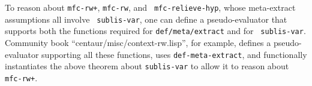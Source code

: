 To reason about {\tt mfc-rw+}, {\tt mfc-rw}, and {\tt
  mfc-relieve-hyp}, whose meta-extract assumptions all involve {\tt
  sublis-var}, one can define a pseudo-evaluator that supports both
the functions required for \texttt{def\-/meta\-/extract} and for {\tt
  sublis-var}.  Community book ``centaur/misc/context-rw.lisp'', for
example, defines a pseudo-evaluator supporting all these functions,
uses {\tt def-meta-extract}, and functionally instantiates the above
theorem about {\tt sublis-var} to allow it to reason about {\tt
  mfc-rw+}.


\begin{comment}
Sol, the list above seems to be more or less just
  saying that the theorems provided by def-meta-extract are those
  described in Section~\ref{sec:general} (file meta-extract.tex).
  That's probably fine, but we should make the connection, I think.
  I've attempted to do that by saying, at the start of
  Section~\ref{sec:general}, that ``These forms correspond to the
  theorems described at the end of Section~\ref{sec:user}.''  Is that
  sufficient?

  [Sol] - I switched it around so that instead of listing the theorems
  here I just say they try to support all the forms listed in Section
  \ref{sec:general}.

  I could add a little bit about what it would look like to prove
  (say) the theorem from the second example using one bad-guy hyp
  instead of three specific hyps but I'm not sure if it would clarify
  much.

  [Matt] Thanks --- looks good.  Yep, I think it's probably not be
  worth showing how a bad-guy hypothesis is used, though if you decide
  you want to do that, I won't object.  More useful might be giving an
  example of using context-rw.lisp.  The description above made sense
  on a sort of word-by-word basis, but I feel sort of fuzzy about it,
  and outlining an example would probably help.  (But don't bother
  unless you feel like doing that.)

\end{comment}
